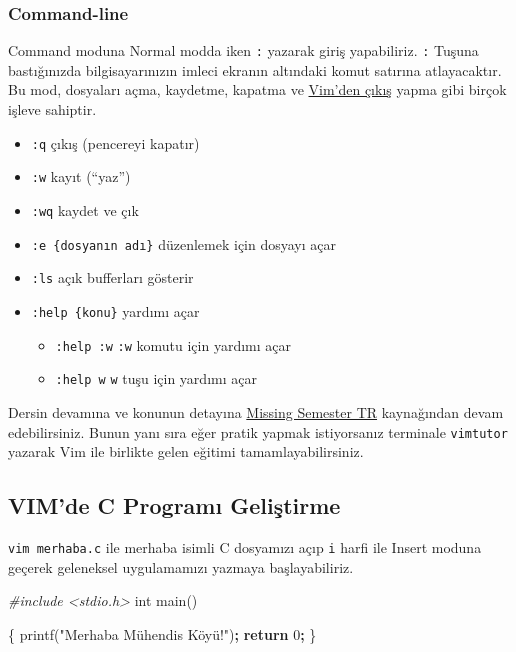 \documentclass[
]{book}
\newenvironment{Shaded}{\begin{snugshade}}{\end{snugshade}}
\newcommand{\BuiltInTok}[1]{#1}
\newcommand{\CommentTok}[1]{\textcolor[rgb]{0.56,0.35,0.01}{\textit{#1}}}
\newcommand{\ControlFlowTok}[1]{\textcolor[rgb]{0.13,0.29,0.53}{\textbf{#1}}}
\newcommand{\DecValTok}[1]{\textcolor[rgb]{0.00,0.00,0.81}{#1}}
\newcommand{\NormalTok}[1]{#1}
\newcommand{\OperatorTok}[1]{\textcolor[rgb]{0.81,0.36,0.00}{\textbf{#1}}}
\newcommand{\StringTok}[1]{\textcolor[rgb]{0.31,0.60,0.02}{#1}}
\providecommand{\tightlist}{%
  \setlength{\itemsep}{0pt}\setlength{\parskip}{0pt}}
\begin{document}
\hypertarget{command-line}{%
\subsubsection{Command-line}\label{command-line}}

Command moduna Normal modda iken \texttt{:} yazarak giriş yapabiliriz. \texttt{:} Tuşuna bastığınızda bilgisayarınızın imleci ekranın altındaki komut satırına atlayacaktır. Bu mod, dosyaları açma, kaydetme, kapatma ve \href{https://twitter.com/iamdevloper/status/435555976687923200}{Vim'den çıkış} yapma gibi birçok işleve sahiptir.

\begin{itemize}
\tightlist
\item
  \texttt{:q} çıkış (pencereyi kapatır)
\item
  \texttt{:w} kayıt (``yaz'')
\item
  \texttt{:wq} kaydet ve çık
\item
  \texttt{:e\ \{dosyanın\ adı\}} düzenlemek için dosyayı açar
\item
  \texttt{:ls} açık bufferları gösterir
\item
  \texttt{:help\ \{konu\}} yardımı açar

  \begin{itemize}
  \tightlist
  \item
    \texttt{:help\ :w} \texttt{:w} komutu için yardımı açar
  \item
    \texttt{:help\ w} \texttt{w} tuşu için yardımı açar
  \end{itemize}
\end{itemize}

Dersin devamına ve konunun detayına \href{https://missing-semester-tr.github.io/}{Missing Semester TR} kaynağından devam edebilirsiniz. Bunun yanı sıra eğer pratik yapmak istiyorsanız terminale \texttt{vimtutor} yazarak Vim ile birlikte gelen eğitimi tamamlayabilirsiniz.

\hypertarget{vimde-c-programux131-geliux15ftirme}{%
\subsection{VIM'de C Programı Geliştirme}\label{vimde-c-programux131-geliux15ftirme}}

\texttt{vim\ merhaba.c} ile merhaba isimli C dosyamızı açıp \texttt{i} harfi ile Insert moduna geçerek geleneksel uygulamamızı yazmaya başlayabiliriz.

\begin{Shaded}
\begin{Highlighting}[]
\CommentTok{\#include <stdio.h>}
\BuiltInTok{int}\NormalTok{ main()}

\NormalTok{\{}
\NormalTok{  printf(}\StringTok{"Merhaba Mühendis Köyü!"}\NormalTok{)}\OperatorTok{;}
  \ControlFlowTok{return} \DecValTok{0}\OperatorTok{;}
\NormalTok{\}}
\end{Highlighting}
\end{Shaded}
\end{document}
